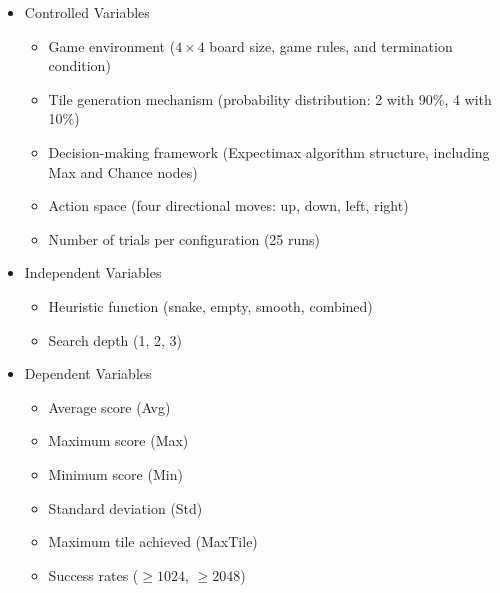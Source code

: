 \documentclass{article}
\begin{document}
\begin{itemize}
  \item Controlled Variables
  \begin{itemize}
    \item Game environment ($4\times4$ board size, game rules, and termination condition)
    \item Tile generation mechanism (probability distribution: 2 with 90\%, 4 with 10\%)
    \item Decision-making framework (Expectimax algorithm structure, including Max and Chance nodes)
    \item Action space (four directional moves: up, down, left, right)
    \item Number of trials per configuration (25 runs)
  \end{itemize}
  \item Independent Variables
  \begin{itemize}
    \item Heuristic function (snake, empty, smooth, combined)
    \item Search depth (1, 2, 3)
  \end{itemize}
  \item Dependent Variables
  \begin{itemize}
    \item Average score (Avg)
    \item Maximum score (Max)
    \item Minimum score (Min)
    \item Standard deviation (Std)
    \item Maximum tile achieved (MaxTile)
    \item Success rates ($\ge1024$, $\ge2048$)
  \end{itemize}
\end{itemize}
\end{document}
